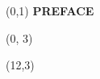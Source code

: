 \documentclass[10pt]{article}
\begin{document}
\begin{textblock}{23}(0,1)
    \center\huge\textbf{PREFACE}
\end{textblock}

\begin{textblock}{11}(0, 3)
    {}
    {}
\end{textblock}

\begin{textblock}{11}(12,3)
    {}
    {}
\end{textblock}
\end{document}
